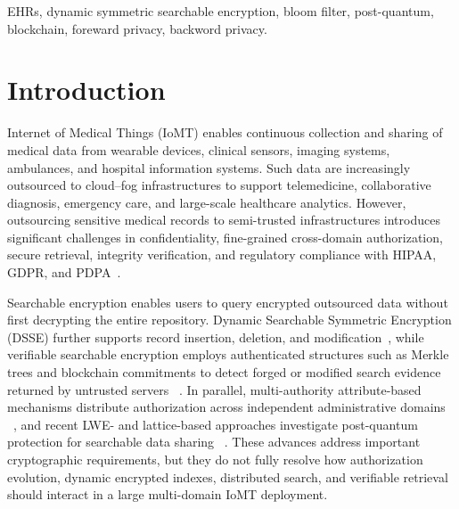 \documentclass{ieeetj}
\theoremstyle{ieee-style}
\begin{document}
\begin{keywords}
EHRs, dynamic symmetric searchable encryption, bloom filter, post-quantum, blockchain, foreward privacy, backword privacy.
\end{keywords}



\maketitle

\section{Introduction}
\label{sec:introduction}

 Internet of Medical Things (IoMT) enables continuous
collection and sharing of medical data from wearable devices, clinical
sensors, imaging systems, ambulances, and hospital information systems.
Such data are increasingly outsourced to cloud--fog infrastructures to
support telemedicine, collaborative diagnosis, emergency care, and
large-scale healthcare analytics. However, outsourcing sensitive medical
records to semi-trusted infrastructures introduces significant challenges
in confidentiality, fine-grained cross-domain authorization, secure
retrieval, integrity verification, and regulatory compliance with HIPAA,
GDPR, and PDPA~\cite{ref1,ref2,ref3,ref4,ref5,ref20,ref21,ref47,ref50,ref51}.

Searchable encryption enables users to query encrypted outsourced data
without first decrypting the entire repository. Dynamic Searchable
Symmetric Encryption (DSSE) further supports record insertion, deletion,
and modification~\cite{ref29,ref30,ref31,ref37,ref38,ref42,ref45,ref46},
while verifiable searchable encryption employs authenticated structures
such as Merkle trees and blockchain commitments to detect forged or
modified search evidence returned by untrusted servers
~\cite{ref6,ref8,ref9,ref10,ref22,ref23,ref24,ref30,ref31,ref32,ref35,ref46}.
In parallel, multi-authority attribute-based mechanisms distribute
authorization across independent administrative domains
~\cite{ref26,ref27,ref28}, and recent LWE- and lattice-based approaches
investigate post-quantum protection for searchable data sharing
~\cite{ref16,ref41,ref52,ref54,ref55}. These advances address important
cryptographic requirements, but they do not fully resolve how
authorization evolution, dynamic encrypted indexes, distributed search,
and verifiable retrieval should interact in a large multi-domain IoMT
deployment.
\end{document}
